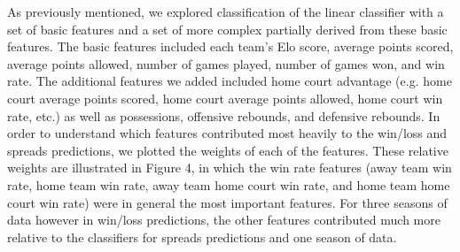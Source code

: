 \documentclass{article}
\begin{document}
As previously mentioned, we explored classification of the linear classifier with a set of basic features and a set of more complex partially derived from these basic features. The basic features included each team's Elo score, average points scored, average points allowed, number of games played, number of games won, and win rate. The additional features we added included home court advantage (e.g. home court average points scored, home court average points allowed, home court win rate, etc.) as well as possessions, offensive rebounds, and defensive rebounds. In order to understand which features contributed most heavily to the win/loss and spreads predictions, we plotted the weights of each of the features. These relative weights are illustrated in Figure 4, in which the win rate features (away team win rate, home team win rate, away team home court win rate, and home team home court win rate) were in general the most important features. For three seasons of data however in win/loss predictions, the other features contributed much more relative to the classifiers for spreads predictions and one season of data.
\end{document}
